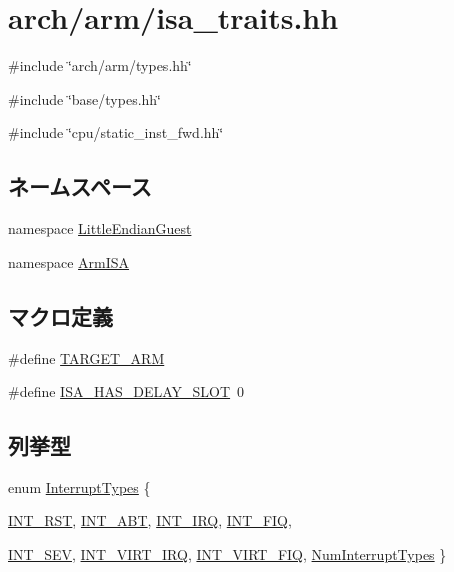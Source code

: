 \hypertarget{arm_2isa__traits_8hh}{
\section{arch/arm/isa\_\-traits.hh}
\label{arm_2isa__traits_8hh}
}
{\ttfamily \#include \char`\"{}arch/arm/types.hh\char`\"{}}\par
{\ttfamily \#include \char`\"{}base/types.hh\char`\"{}}\par
{\ttfamily \#include \char`\"{}cpu/static\_\-inst\_\-fwd.hh\char`\"{}}\par
\subsection*{ネームスペース}
\begin{DoxyCompactItemize}
\item 
namespace \hyperlink{namespaceLittleEndianGuest}{LittleEndianGuest}
\item 
namespace \hyperlink{namespaceArmISA}{ArmISA}
\end{DoxyCompactItemize}
\subsection*{マクロ定義}
\begin{DoxyCompactItemize}
\item 
\#define \hyperlink{arm_2isa__traits_8hh_a8fba137e52763018c6ec43fc1a186b24}{TARGET\_\-ARM}
\item 
\#define \hyperlink{arm_2isa__traits_8hh_aae21ac6833454e7ead9810c372658afc}{ISA\_\-HAS\_\-DELAY\_\-SLOT}~0
\end{DoxyCompactItemize}
\subsection*{列挙型}
\begin{DoxyCompactItemize}
\item 
enum \hyperlink{namespaceArmISA_acdad6d81b9a94402ce3979d531ae4f40}{InterruptTypes} \{ \par
\hyperlink{namespaceArmISA_acdad6d81b9a94402ce3979d531ae4f40a6502fc93f34a10d983e9f9db961098a9}{INT\_\-RST}, 
\hyperlink{namespaceArmISA_acdad6d81b9a94402ce3979d531ae4f40abd6f837dfc1ad805c4ccddb9369054a5}{INT\_\-ABT}, 
\hyperlink{namespaceArmISA_acdad6d81b9a94402ce3979d531ae4f40add353561660da2611ad8b75f3b07d6fa}{INT\_\-IRQ}, 
\hyperlink{namespaceArmISA_acdad6d81b9a94402ce3979d531ae4f40a1658cced312e183e2e203cf8763187cb}{INT\_\-FIQ}, 
\par
\hyperlink{namespaceArmISA_acdad6d81b9a94402ce3979d531ae4f40ac49664b60f7f320bb246cdd31a209200}{INT\_\-SEV}, 
\hyperlink{namespaceArmISA_acdad6d81b9a94402ce3979d531ae4f40ae451b226c8257315d10d046fa3aefe6a}{INT\_\-VIRT\_\-IRQ}, 
\hyperlink{namespaceArmISA_acdad6d81b9a94402ce3979d531ae4f40a46f0336f00963d40f208d4a54e52bbd4}{INT\_\-VIRT\_\-FIQ}, 
\hyperlink{namespaceArmISA_acdad6d81b9a94402ce3979d531ae4f40a2c6432ad9b7436e1bf24e9e795c49d50}{NumInterruptTypes}
 \}
\end{DoxyCompactItemize}

